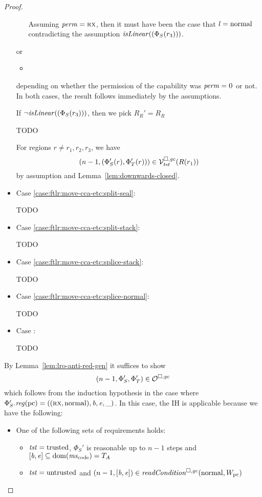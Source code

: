 \begin{proof}
\begin{itemize}
\begin{itemize}
      Assuming $\perm = \rx$, then it must have been the case that $\lin = \normal$ contradicting the assumption $\isLinear{(\Phi_S(r_3))}$.
      
    \end{itemize}
    or
    \begin{itemize}
    \item 
    \end{itemize}
    depending on whether the permission of the capability was $\perm = \noperm$
    or not. In both cases, the result follows immediately by the assumptions.

    If $\neg \isLinear{(\Phi_S(r_3))}$, then we pick $R_R' = R_R$

    TODO

    For regions $r \neq r_1,r_2,r_3$, we have
    \[
      \npair[n-1]{(\Phi_S'(r), \Phi_T'(r))} \in \lrvg{\trust}(R(r_1))
    \]
    by assumption and Lemma~\ref{lem:downwards-closed}.
  \item Case \ref{case:ftlr:move-cca-etc:split-seal}:

TODO
  \item Case \ref{case:ftlr:move-cca-etc:split-stack}:

TODO
  \item Case \ref{case:ftlr:move-cca-etc:splice-stack}:

TODO
  \item Case \ref{case:ftlr:move-cca-etc:splice-normal}:

TODO
  \item Case \label{case:ftlr:move-cca-etc:splice-seal}:

TODO
  \end{itemize}


  By Lemma~\ref{lem:lro-anti-red-gen} it suffices to show
  \[
    \npair[n-1]{\Phi_S',\Phi_T'} \in \lro
  \]
  which follows from the induction hypothesis in the case where $\Phi_S'.\reg(\pcreg) = ((\rx,\normal),\baddr,\eaddr,\_)$.
  In this case, the IH is applicable because we have the following:
  \begin{itemize}
  \item One of the following sets of requirements holds:
    \begin{itemize}
    \item $\trust = \trusted$, $\Phi_S'$ is reasonable up to $n-1$ steps and $[\baddr,\eaddr] \subseteq \dom(\mscode) = \ta$
    \item $\trust = \untrusted$ and $\npair[n-1]{[\baddr,\eaddr]} \in \readCond{\normal,W_\pcreg}$
    \end{itemize}


\end{itemize}
\end{proof}
